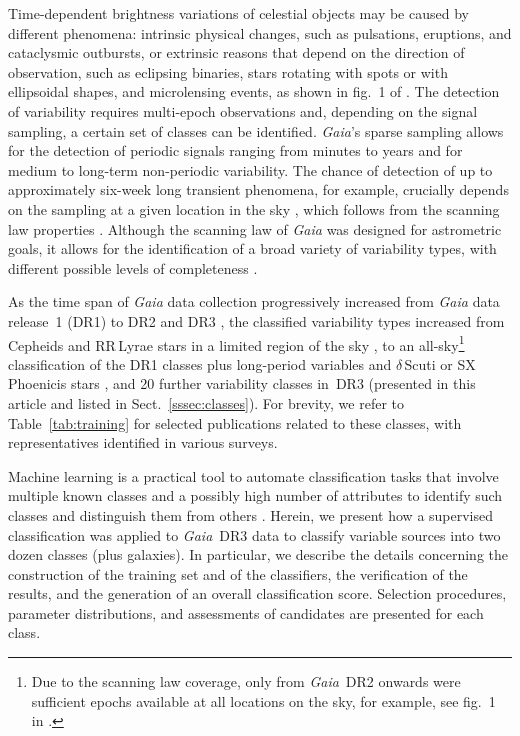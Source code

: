 \documentclass[longauth]{aa}
\def\gaia{\textit{Gaia}\xspace}
\begin{document}
Time-dependent brightness variations of celestial objects may be caused by different phenomena: intrinsic physical changes, such as pulsations, eruptions, and cataclysmic outbursts, or extrinsic reasons that depend on the direction of observation, such as eclipsing binaries, stars rotating with spots or with ellipsoidal shapes, and microlensing events, 
 as shown in fig.~1 of \citet{2019A&A...623A.110G}.
The detection of variability requires multi-epoch observations and, depending on the signal sampling, a certain set of classes can be identified.  \gaia's sparse sampling allows for the detection of periodic signals ranging from minutes to years and for medium to long-term non-periodic variability. The chance of detection of up to approximately six-week long transient phenomena, for example, crucially depends on the sampling at a given location in the sky \citep[see appendix~A in][]{2017arXiv170203295E}, which follows from the scanning law properties \citep{2016A&A...595A...1G}. Although the scanning law of \gaia was designed for astrometric goals, it allows for the identification of a broad variety of variability types, with different possible levels of completeness \citep{DR3-DPACP-162}.  

As the time span of \gaia data collection progressively increased from \gaia data release~1 (DR1) to DR2 and DR3 \citep[14, 22, and 34 months, respectively;][]{2016A&A...595A...2G,2018A&A...616A...1G,DR3-DPACP-185}, the classified variability types increased from Cepheids and RR\,Lyrae stars in a limited region of the sky \citep[in DR1;][]{2017arXiv170203295E}, to an all-sky\footnote{Due to the scanning law coverage, only from \gaia~DR2 onwards were sufficient epochs available at all locations on the sky, for example, see fig.~1 in \citet{2018A&A...618A..30H}.} classification of the DR1 classes plus long-period variables and $\delta$\,Scuti or SX\,Phoenicis stars \citep[in DR2;][]{2019A&A...625A..97R}, and 20 further variability classes in~DR3 (presented in this article and listed in Sect.~\ref{sssec:classes}). 
For brevity, we refer to Table~\ref{tab:training} for selected publications related to these classes, with representatives identified in various surveys. 

Machine learning is a practical tool to automate classification tasks that involve multiple known classes and a possibly high number of attributes to identify such classes and distinguish them from others \citep[e.g.\ see][]{2007A&A...475.1159D,2009A&A...494..739S,2010ApJ...713L.204B,2011ApJ...733...10R,2011MNRAS.414.2602D}. 
Herein, we present how a supervised classification was applied to \gaia~DR3 data to classify variable sources into two dozen classes (plus galaxies). 
In particular, we describe the details concerning the construction of the training set and of the classifiers, the verification of the results, and the generation of an overall classification score. Selection procedures, parameter distributions, and assessments of candidates are presented for each class.
\end{document}
